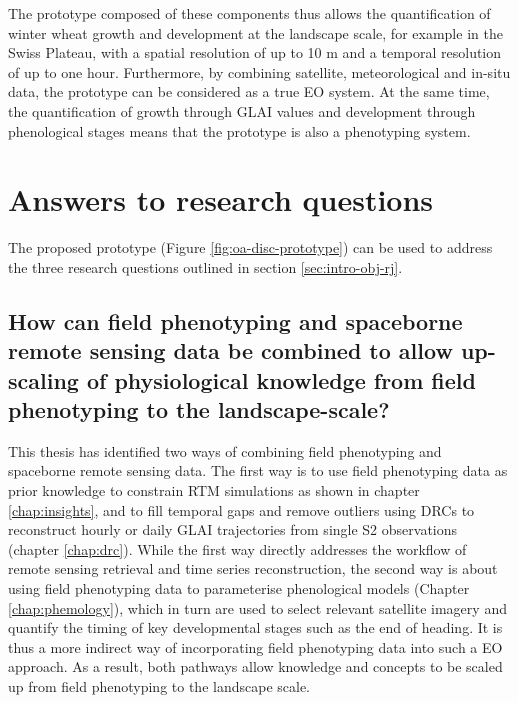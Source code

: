 The prototype composed of these components thus allows the quantification of winter wheat growth and development at the landscape scale, for example in the Swiss Plateau, with a spatial resolution of up to 10 m and a temporal resolution of up to one hour. Furthermore, by combining satellite, meteorological and in-situ data, the prototype can be considered as a true \gls{EO} system. At the same time, the quantification of growth through \gls{GLAI} values and development through phenological stages means that the prototype is also a phenotyping system.

\section{Answers to research questions}
The proposed prototype (Figure \ref{fig:oa-disc-prototype}) can be used to address the three research questions outlined in section \ref{sec:intro-obj-rj}.

\subsection{How can field phenotyping and spaceborne remote sensing data be combined to allow up-scaling of physiological knowledge from field phenotyping to the landscape-scale?}
This thesis has identified two ways of combining field phenotyping and spaceborne remote sensing data. The first way is to use field phenotyping data as prior knowledge to constrain \gls{RTM} simulations as shown in chapter \ref{chap:insights}, and to fill temporal gaps and remove outliers using \gls{DRC}s to reconstruct hourly or daily \gls{GLAI} trajectories from single \gls{S2} observations (chapter \ref{chap:drc}). While the first way directly addresses the workflow of remote sensing retrieval and time series reconstruction, the second way is about using field phenotyping data to parameterise phenological models (Chapter \ref{chap:phemology}), which in turn are used to select relevant satellite imagery and quantify the timing of key developmental stages such as the end of heading. It is thus a more indirect way of incorporating field phenotyping data into such a \gls{EO} approach. As a result, both pathways allow knowledge and concepts to be scaled up from field phenotyping to the landscape scale.


